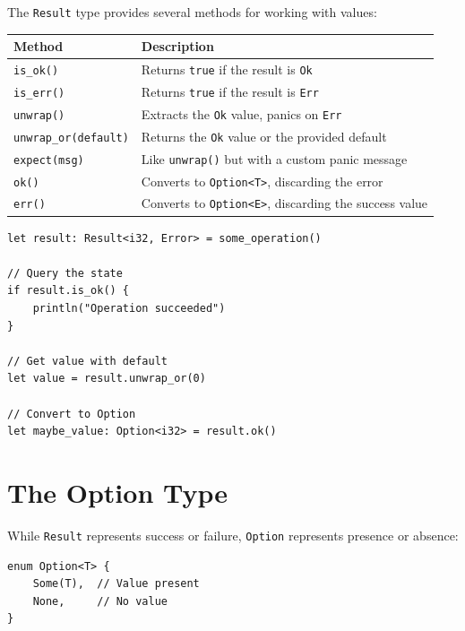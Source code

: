 The \texttt{Result} type provides several methods for working with values:

\begin{center}
\begin{tabular}{lp{8cm}}
\textbf{Method} & \textbf{Description} \\
\hline
\texttt{is\_ok()} & Returns \texttt{true} if the result is \texttt{Ok} \\
\texttt{is\_err()} & Returns \texttt{true} if the result is \texttt{Err} \\
\texttt{unwrap()} & Extracts the \texttt{Ok} value, panics on \texttt{Err} \\
\texttt{unwrap\_or(default)} & Returns the \texttt{Ok} value or the provided default \\
\texttt{expect(msg)} & Like \texttt{unwrap()} but with a custom panic message \\
\texttt{ok()} & Converts to \texttt{Option<T>}, discarding the error \\
\texttt{err()} & Converts to \texttt{Option<E>}, discarding the success value \\
\end{tabular}
\end{center}

\begin{lstlisting}
let result: Result<i32, Error> = some_operation()

// Query the state
if result.is_ok() {
    println("Operation succeeded")
}

// Get value with default
let value = result.unwrap_or(0)

// Convert to Option
let maybe_value: Option<i32> = result.ok()
\end{lstlisting}

\section{The Option Type}
\label{sec:option-type}

While \texttt{Result} represents success or failure, \texttt{Option} represents presence or absence:

\begin{lstlisting}
enum Option<T> {
    Some(T),  // Value present
    None,     // No value
}
\end{lstlisting}

